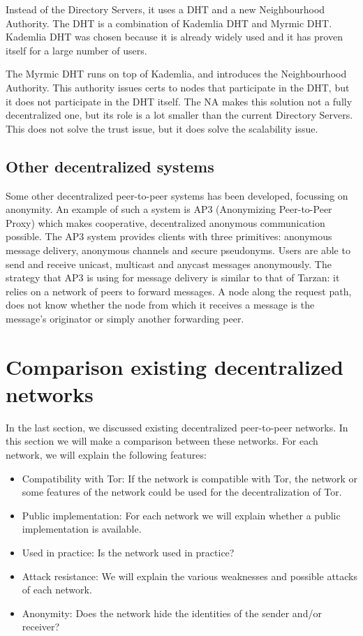 \documentclass{article}
\begin{document}
		Instead of the Directory Servers, it uses a DHT and a new Neighbourhood Authority. The DHT is a combination of Kademlia DHT and Myrmic DHT. Kademlia DHT was chosen because it is already widely used and it has proven itself for a large number of users.
		
		The Myrmic DHT runs on top of Kademlia, and introduces the Neighbourhood Authority. This authority issues certs to nodes that participate in the DHT, but it does not participate in the DHT itself. The NA makes this solution not a fully decentralized one, but its role is a lot smaller than the current Directory Servers. This does not solve the trust issue, but it does solve the scalability issue.
		
	\subsection{Other decentralized systems}
		Some other decentralized peer-to-peer systems has been developed, focussing on anonymity. An example of such a system is AP3 (Anonymizing Peer-to-Peer Proxy) \cite{mislove2004ap3} which makes cooperative, decentralized anonymous communication possible. The AP3 system provides clients with three primitives: anonymous message delivery, anonymous channels and secure pseudonyms. Users are able to send and receive unicast, multicast and anycast messages anonymously. The strategy that AP3 is using for message delivery is similar to that of Tarzan: it relies on a network of peers to forward messages. A node along the request path, does not know whether the node from which it receives a message is the message's originator or simply another forwarding peer.

\section{Comparison existing decentralized networks}
	\label{sec:comparison}
	
	
	
	In the last section, we discussed existing decentralized peer-to-peer networks. In this section we will make a comparison between these networks. For each network, we will explain the following features:

	\begin{itemize}
		\item{Compatibility with Tor:} If the network is compatible with Tor, the network or some features of the network could be used for the decentralization of Tor.
		\item{Public implementation:} For each network we will explain whether a public implementation is available.
		\item{Used in practice:} Is the network used in practice?
		\item{Attack resistance:} We will explain the various weaknesses and possible attacks of each network.
		\item{Anonymity:} Does the network hide the identities of the sender and/or receiver?
	\end{itemize}
	
\end{document}

